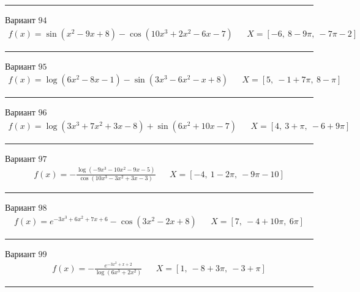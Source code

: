 \documentclass[11pt]{report}
\begin{document}
\begin{center}
    \noindent\rule{8cm}{0.4pt}
\end{center}
Вариант \(94\)
\begin{align*}
    f(x) = \sin{\left(x^{2} - 9 x + 8 \right)} - \cos{\left(10 x^{3} + 2 x^{2} - 6 x - 7 \right)} && X = \left[ -6, \  8 - 9 \pi, \  - 7 \pi - 2\right]
\end{align*}
\begin{center}
    \noindent\rule{8cm}{0.4pt}
\end{center}
Вариант \(95\)
\begin{align*}
    f(x) = \log{\left(6 x^{2} - 8 x - 1 \right)} - \sin{\left(3 x^{3} - 6 x^{2} - x + 8 \right)} && X = \left[ 5, \  -1 + 7 \pi, \  8 - \pi\right]
\end{align*}
\begin{center}
    \noindent\rule{8cm}{0.4pt}
\end{center}
Вариант \(96\)
\begin{align*}
    f(x) = \log{\left(3 x^{3} + 7 x^{2} + 3 x - 8 \right)} + \sin{\left(6 x^{2} + 10 x - 7 \right)} && X = \left[ 4, \  3 + \pi, \  -6 + 9 \pi\right]
\end{align*}
\begin{center}
    \noindent\rule{8cm}{0.4pt}
\end{center}
Вариант \(97\)
\begin{align*}
    f(x) = - \frac{\log{\left(- 9 x^{3} - 10 x^{2} - 9 x - 5 \right)}}{\cos{\left(10 x^{3} - 3 x^{2} + 3 x - 3 \right)}} && X = \left[ -4, \  1 - 2 \pi, \  - 9 \pi - 10\right]
\end{align*}
\begin{center}
    \noindent\rule{8cm}{0.4pt}
\end{center}
Вариант \(98\)
\begin{align*}
    f(x) = e^{- 3 x^{3} + 6 x^{2} + 7 x + 6} - \cos{\left(3 x^{2} - 2 x + 8 \right)} && X = \left[ 7, \  -4 + 10 \pi, \  6 \pi\right]
\end{align*}
\begin{center}
    \noindent\rule{8cm}{0.4pt}
\end{center}
Вариант \(99\)
\begin{align*}
    f(x) = - \frac{e^{- 3 x^{2} + x + 2}}{\log{\left(6 x^{3} + 2 x^{2} \right)}} && X = \left[ 1, \  -8 + 3 \pi, \  -3 + \pi\right]
\end{align*}
\begin{center}
    \noindent\rule{8cm}{0.4pt}
\end{center}
\end{document}
